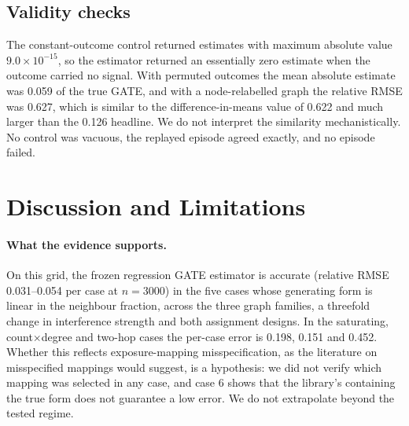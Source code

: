 \documentclass{article}
\begin{document}
\subsection{Validity checks}
The constant-outcome control returned estimates with maximum absolute value $9.0\times10^{-15}$, %
 so the estimator returned an essentially zero estimate when the outcome carried no signal. With permuted outcomes the mean absolute estimate was 0.059 of the true GATE, %
 and with a node-relabelled graph the relative RMSE was 0.627, %
 which is similar to the difference-in-means value of 0.622 and much larger than the 0.126 headline. %
 We do not interpret the similarity mechanistically. No control was vacuous, the replayed episode agreed exactly, and no episode failed. %

\section{Discussion and Limitations}
\label{sec:limits}
\paragraph{What the evidence supports.} On this grid, the frozen regression GATE estimator is accurate (relative RMSE 0.031--0.054 per case at $n=3000$) in the five cases whose generating form is linear in the neighbour fraction, across the three graph families, a threefold change in interference strength and both assignment designs. In the saturating, count$\times$degree and two-hop cases the per-case error is 0.198, 0.151 and 0.452. Whether this reflects exposure-mapping misspecification, as the literature on misspecified mappings would suggest, is a hypothesis: we did not verify which mapping was selected in any case, and case 6 shows that the library's containing the true form does not guarantee a low error. We do not extrapolate beyond the tested regime.
\end{document}
